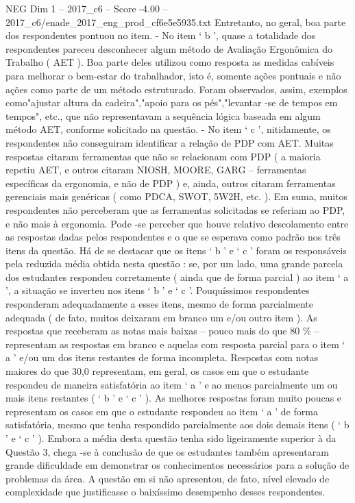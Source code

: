 \begin{textsample}{NEG Dim 1 – 2017\_c6 – Score -4.00 – 2017\_c6/enade\_2017\_eng\_prod\_cf6e5e5935.txt}
Entretanto, no geral, boa parte dos respondentes pontuou no item. - No item ‘ b ’, quase a totalidade dos respondentes pareceu desconhecer algum método de Avaliação Ergonômica do Trabalho ( AET ).
Boa parte deles utilizou como resposta as medidas cabíveis para melhorar o bem-estar do trabalhador, isto é, somente ações pontuais e não ações como parte de um método estruturado.
Foram observados, assim, exemplos como"ajustar altura da cadeira","apoio para os pés","levantar -se de tempos em tempos", etc., que não representavam a sequência lógica baseada em algum método AET, conforme solicitado na questão. - No item ‘ c ’, nitidamente, os respondentes não conseguiram identificar a relação de PDP com AET.
Muitas respostas citaram ferramentas que não se relacionam com PDP ( a maioria repetiu AET, e outros citaram NIOSH, MOORE, GARG – ferramentas específicas da ergonomia, e não de PDP ) e, ainda, outros citaram ferramentas gerenciais mais genéricas ( como PDCA, SWOT, 5W2H, etc. ).
Em suma, muitos respondentes não perceberam que as ferramentas solicitadas se referiam ao PDP, e não mais à ergonomia.
Pode -se perceber que houve relativo descolamento entre as respostas dadas pelos respondentes e o que se esperava como padrão nos três itens da questão.
Há de se destacar que os itens ‘ b ’ e ‘ c ’ foram os responsáveis pela reduzida média obtida nesta questão : se, por um lado, uma grande parcela dos estudantes respondeu corretamente ( ainda que de forma parcial ) ao item ‘ a ’, a situação se inverteu nos itens ‘ b ’ e ‘ c ’.
Pouquíssimos respondentes responderam adequadamente a esses itens, mesmo de forma parcialmente adequada ( de fato, muitos deixaram em branco um e/ou outro item ).
As respostas que receberam as notas mais baixas – pouco mais do que 80 \% – representam as respostas em branco e aquelas com resposta parcial para o item ‘ a ’ e/ou um dos itens restantes de forma incompleta.
Respostas com notas maiores do que 30,0 representam, em geral, os casos em que o estudante respondeu de maneira satisfatória ao item ‘ a ’ e ao menos parcialmente um ou mais itens restantes ( ‘ b ’ e ‘ c ’ ).
As melhores respostas foram muito poucas e representam os casos em que o estudante respondeu ao item ‘ a ’ de forma satisfatória, mesmo que tenha respondido parcialmente aos dois demais itens ( ‘ b ’ e ‘ c ’ ).
Embora a média desta questão tenha sido ligeiramente superior à da Questão 3, chega -se à conclusão de que os estudantes também apresentaram grande dificuldade em demonstrar os conhecimentos necessários para a solução de problemas da área.
A questão em si não apresentou, de fato, nível elevado de complexidade que justificasse o baixíssimo desempenho desses respondentes.

\end{textsample}
